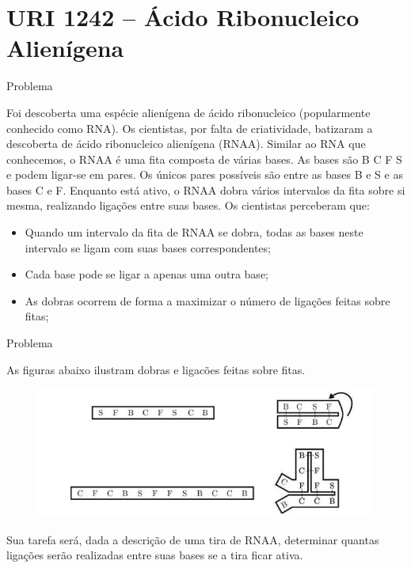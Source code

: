 \section{URI 1242 -- Ácido Ribonucleico Alienígena}

\begin{frame}[fragile]{Problema}

Foi descoberta uma espécie alienígena de ácido ribonucleico (popularmente conhecido como RNA). Os cientistas, por falta de criatividade, batizaram a descoberta de ácido ribonucleico alienígena (RNAA). Similar ao RNA que conhecemos, o RNAA é uma fita composta de várias bases. As bases são B C F S e podem ligar-se em pares. Os únicos pares possíveis são entre as bases B e S e as bases C e F.
Enquanto está ativo, o RNAA dobra vários intervalos da fita sobre si mesma, realizando ligações entre suas bases. Os cientistas perceberam que:

\begin{itemize}
\item Quando um intervalo da fita de RNAA se dobra, todas as bases neste intervalo se ligam com suas bases correspondentes;
\item Cada base pode se ligar a apenas uma outra base;
\item As dobras ocorrem de forma a maximizar o número de ligações feitas sobre fitas;
\end{itemize}

\end{frame}

\begin{frame}[fragile]{Problema}

As figuras abaixo ilustram dobras e ligacões feitas sobre fitas.

\begin{figure}
    \centering
    \includegraphics[scale=0.7]{UOJ_1242.jpg}
\end{figure}

Sua tarefa será, dada a descrição de uma tira de RNAA, determinar quantas ligações serão realizadas entre suas bases se a tira ficar ativa.

\end{frame}

